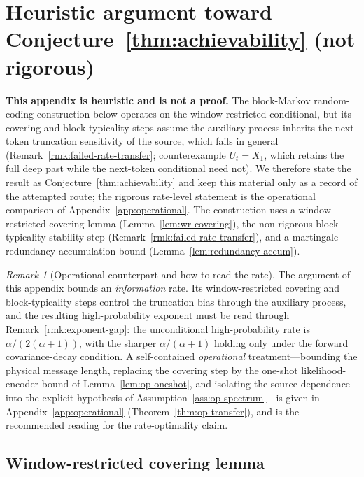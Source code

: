 \documentclass[11pt]{article}
\theoremstyle{plain}
\theoremstyle{definition}
\theoremstyle{remark}
\newtheorem{remark}[theorem]{Remark}
\begin{document}
\section{Heuristic argument toward Conjecture~\ref{thm:achievability} (not rigorous)}
\label{app:achievability}

\textbf{This appendix is heuristic and is not a proof.} The
block-Markov random-coding construction below operates on the
window-restricted conditional, but its covering and block-typicality
steps assume the auxiliary process inherits the next-token truncation
sensitivity of the source, which fails in general
(Remark~\ref{rmk:failed-rate-transfer}; counterexample $U_t=X_1$,
which retains the full deep past while the next-token conditional need
not). We therefore state the result as Conjecture~\ref{thm:achievability}
and keep this material only as a record of the attempted route; the
rigorous rate-level statement is the operational comparison of
Appendix~\ref{app:operational}. The construction uses
a window-restricted covering lemma
(Lemma~\ref{lem:wr-covering}), the non-rigorous block-typicality
stability step (Remark~\ref{rmk:failed-rate-transfer}), and a
martingale redundancy-accumulation bound
(Lemma~\ref{lem:redundancy-accum}).

\begin{remark}[Operational counterpart and how to read the rate]
\label{rmk:ach-superseded}
The argument of this appendix bounds an \emph{information} rate. Its
window-restricted covering and block-typicality steps control the
truncation bias through the auxiliary process, and the resulting
high-probability exponent must be read through
Remark~\ref{rmk:exponent-gap}: the unconditional high-probability
rate is $\alpha/(2(\alpha+1))$, with the sharper $\alpha/(\alpha+1)$
holding only under the forward covariance-decay condition. A
self-contained \emph{operational} treatment---bounding the physical
message length, replacing the covering step by the one-shot
likelihood-encoder bound of Lemma~\ref{lem:op-oneshot}, and isolating
the source dependence into the explicit hypothesis of
Assumption~\ref{ass:op-spectrum}---is given in
Appendix~\ref{app:operational} (Theorem~\ref{thm:op-transfer}), and is
the recommended reading for the rate-optimality claim.
\end{remark}

\subsection{Window-restricted covering lemma}
\end{document}
